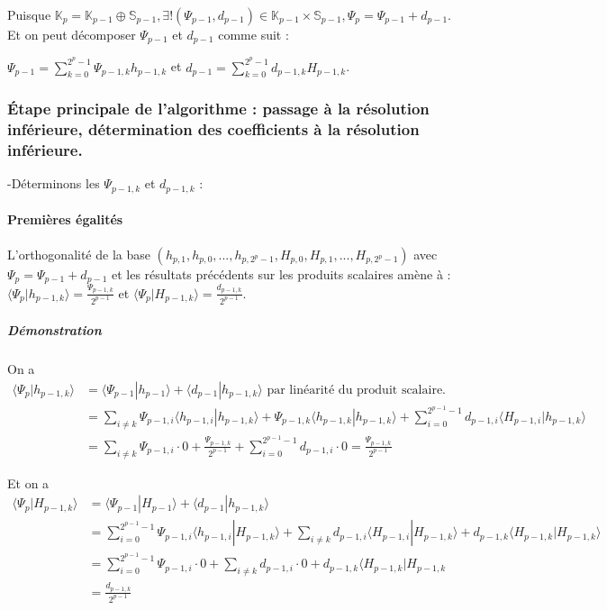 \documentclass{article}
\begin{document}
Puisque $\mathbb{K}_{p} = \mathbb{K}_{p-1} \oplus \mathbb{S}_{p-1}, \exists{}!(\Psi{}_{p-1},d_{p-1}) \in \mathbb{K}_{p-1} \times \mathbb{S}_{p-1}, \Psi{}_p = \Psi{}_{p-1} + d_{p-1} $. \\

Et on peut décomposer $\Psi{}_{p-1}$ et $d_{p-1}$ comme suit :

$\displaystyle \Psi{}_{p-1} = \sum_{k=0}^{2^p - 1} \Psi{}_{p-1,k}h_{p-1,k}$ et $d_{p-1} = \sum_{k=0}^{2^p - 1} d_{p-1,k}H_{p-1,k}$. \\

\subsubsection{\uppercase{é}tape principale de l'algorithme : passage à la résolution inférieure, détermination des coefficients à la résolution inférieure.}

-Déterminons les $\Psi{}_{p-1,k}$ et $d_{p-1,k}$ :

\paragraph{Premières égalités}
L'orthogonalité de la base $(h_{p,1},h_{p,0},...,h_{p,2^p - 1},H_{p,0},H_{p,1},...,H_{p,2^p - 1})$ avec $\Psi{}_{p} = \Psi{}_{p-1} + d_{p-1}$ et les résultats précédents sur les produits scalaires amène à : $\langle \Psi{}_{p}|h_{p-1,k} \rangle = \frac{\Psi{}_{p-1,k}}{2^{p-1}}$ et $\langle \Psi{}_{p}|H_{p-1,k} \rangle = \frac{d_{p-1,k}}{2^{p-1}}$. \\

\subparagraph*{Démonstration} 

On a \begin{align*}
 \langle\Psi{}_{p}|h_{p-1,k} \rangle &= \langle \Psi{}_{p-1}|h_{p-1}\rangle + \langle d_{p-1}|h_{p-1,k} \rangle  \text{ par linéarité du produit scalaire.} \\
 &= \sum_{i \neq k} \Psi{}_{p-1,i} \langle h_{p-1,i}|h_{p-1,k} \rangle + \Psi{}_{p-1,k} \langle h_{p-1,k}|h_{p-1,k} \rangle + \sum_{i=0}^{2^{p-1} - 1} d_{p-1,i}\langle H_{p-1,i}|h_{p-1,k} \rangle  \\
 &= \sum_{i \neq k} \Psi{}_{p-1,i}\cdot{}0 + \frac{\Psi{}_{p-1,k}}{2^{p-1}} + \sum_{i=0}^{2^{p-1} - 1} d_{p-1,i}\cdot{}0 = \frac{\Psi{}_{p-1,k}}{2^{p-1}} 
 \end{align*}

Et on a 
\begin{align*} \displaystyle
 \langle\Psi{}_{p}|H_{p-1,k} \rangle &= \langle \Psi{}_{p-1}|H_{p-1}\rangle + \langle d_{p-1}|h_{p-1,k} \rangle  \\
&= \sum_{i=0}^{2^{p-1}-1} \Psi{}_{p-1,i}\langle h_{p-1,i}|H_{p-1,k}\rangle + \sum_{i \neq k}d_{p-1,i}\langle{}H_{p-1,i}|H_{p-1,k} \rangle + d_{p-1,k}\langle{}H_{p-1,k}|H_{p-1,k}\rangle  \\
&= \sum_{i=0}^{2^{p-1}-1}\Psi{}_{p-1,i}\cdot{}0 + \sum_{i \neq k}d_{p-1,i}\cdot{}0 + d_{p-1,k}\langle{}H_{p-1,k}|H_{p-1,k} \\ &= \frac{d_{p-1,k}}{2^{p-1}}
\end{align*} \\
\end{document}
